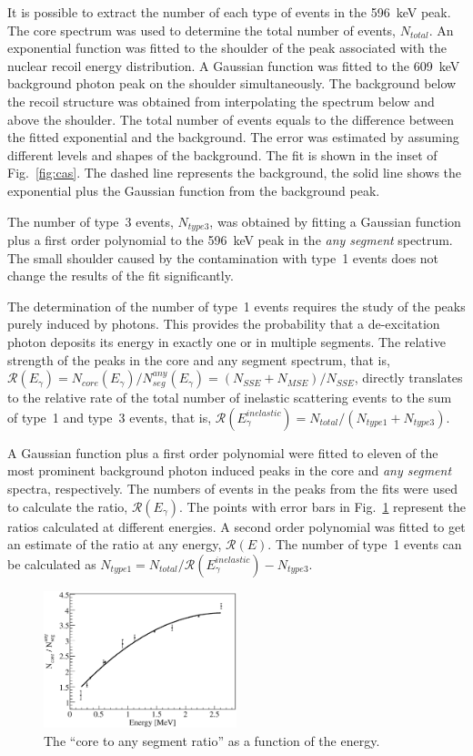 \documentclass{elsart}
\begin{document}
It is possible to extract the number of each type of events in the
596~keV peak. The core spectrum was used to determine the total number
of events, $N_{total}$. An exponential function was fitted to the
shoulder of the peak associated with the nuclear recoil energy
distribution. A Gaussian function was fitted to the 609~keV background
photon peak on the shoulder simultaneously. The background below the
recoil structure was obtained from interpolating the spectrum below
and above the shoulder. The total number of events equals to the
difference between the fitted exponential and the background. The
error was estimated by assuming different levels and shapes of the
background. The fit is shown in the inset of Fig.~\ref{fig:cas}. The
dashed line represents the background, the solid line shows the
exponential plus the Gaussian function from the background peak.

The number of type~3 events, $N_{type3}$, was obtained by fitting a
Gaussian function plus a first order polynomial to the 596~keV peak in
the \emph{any segment} spectrum. The small shoulder caused by the
contamination with type~1 events does not change the results of the
fit significantly.

The determination of the number of type~1 events requires the study of
the peaks purely induced by photons. This provides the probability
that a de-excitation photon deposits its energy in exactly one or in
multiple segments. The relative strength of the peaks in the core and
any segment spectrum, that is, $\mathcal{R}(E_{\gamma}) =
N_{core}(E_{\gamma}) / N^{any}_{seg}(E_{\gamma}) = (N_{SSE} + N_{MSE})
/ N_{SSE}$, directly translates to the relative rate of the total
number of inelastic scattering events to the sum of type~1 and type~3
events, that is, $\mathcal{R}(E_{\gamma}^{inelastic}) = N_{total} /
(N_{type1} + N_{type3})$.

A Gaussian function plus a first order polynomial were fitted to
eleven of the most prominent background photon induced peaks in the
core and \emph{any segment} spectra, respectively. The numbers of
events in the peaks from the fits were used to calculate the ratio,
$\mathcal{R}(E_{\gamma})$. The points with error bars in
Fig.~\ref{fig:sf} represent the ratios calculated at different
energies. A second order polynomial was fitted to get an estimate of
the ratio at any energy, $\mathcal{R}(E)$. The number of type~1 events
can be calculated as $N_{type1} = N_{total} /
\mathcal{R}(E_{\gamma}^{inelastic}) - N_{type3}$.

\begin{figure}[tbhp]
  \centering
  \includegraphics[width=0.5\textwidth,clip]{sf.eps}
  \caption{The ``core to any segment ratio'' as a function of the
    energy.}
  \label{fig:sf}
\end{figure}
\end{document}
